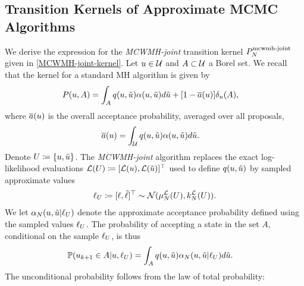\documentclass[12pt]{article}
\begin{document}
\subsection{Transition Kernels of Approximate MCMC Algorithms} \label{transition_kernel_derivations}
We derive the expression for the \textit{MCWMH-joint} transition 
kernel $\llikEmJointMCWMH[\Ndesign]{\MarkovKernel}$ given in \ref{MCWMH-joint-kernel}. 
Let $\Par \in \parSpace$ and $A \subset \parSpace$ a Borel set. 
We recall that the kernel for a standard MH algorithm is given by 
\begin{align}
\MarkovKernel(\Par, A)
&= \int_{A} \propDens(\Par, \propPar) \accProbMH(\Par, \propPar) d\propPar
+ [1 - \avgAccProbMH(\Par)] \delta_{\Par}(A) \label{MH-kernel}, 
\end{align}
where $\avgAccProbMH(\Par)$ is the overall acceptance probability, averaged over all proposals,
\begin{align}
\avgAccProbMH(\Par)
&= \int_{\parSpace} \propDens(\Par, \propPar) \accProbMH(\Par, \propPar) d\propPar. 
\end{align}
Denote $\parMat \Def \{\Par, \propPar\}$. 
The \textit{MCWMH-joint} algorithm replaces the exact log-likelihood evaluations 
$\llik(\parMat) \Def [\llik(\Par), \llik(\propPar)]^\top$ used to define $\propDens(\Par, \propPar)$ by 
sampled approximate values 
\begin{align}
\llikSamp_{\parMat} \Def [\llikSamp, \llikSampProp]^\top \sim \Gaussian(\emMean[\Ndesign]{\llik}(\parMat), \emKer[\Ndesign]{\llik}(\parMat)). 
\end{align}
We let $\Em[\Ndesign]{\accProbMH}(\Par, \propPar | \llikSamp_{\parMat})$ denote the approximate acceptance probability defined using 
the sampled values $\llikSamp_{\parMat}$. The probability of accepting a state in the set $A$, conditional on the sample $\llikSamp_{\parMat}$, 
is thus 
\begin{align}
\Prob(\indexMCMC[\mcmcIndex+1]{\Par} \in A | \Par, \llikSamp_{\parMat})
&=  \int_{A} \propDens(\Par, \propPar) \Em[\Ndesign]{\accProbMH}(\Par, \propPar | \llikSamp_{\parMat}) d\propPar. 
\end{align}
The unconditional probability follows from the law of total probability:
\end{document}

